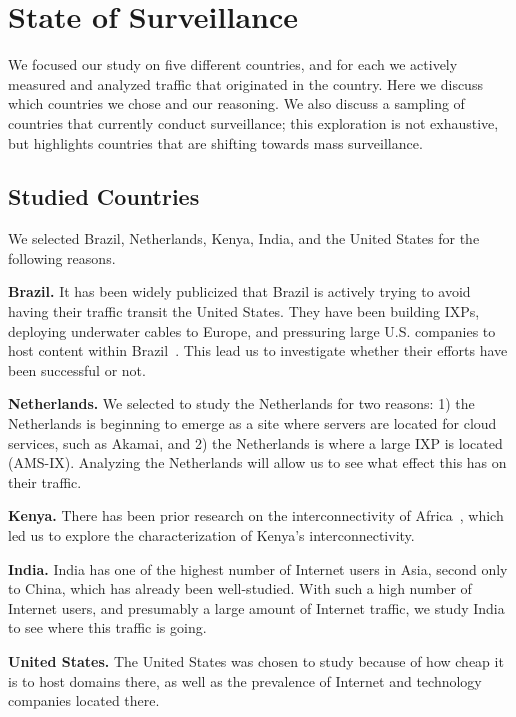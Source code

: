 \section{State of Surveillance}
\label{surv}
We focused our study on five different countries, and for each we actively measured and analyzed traffic that originated in the country.  Here we discuss which countries we chose and our reasoning.  We also discuss a sampling of countries that currently conduct surveillance; this exploration is not exhaustive, but highlights countries that are shifting towards mass surveillance.  

\subsection{Studied Countries}
We selected Brazil, Netherlands, Kenya, India, and the United States for the following reasons.

{\bf Brazil.} It has been widely publicized that Brazil is actively trying to avoid having their traffic transit the United States.  They have been building IXPs, deploying underwater cables to Europe, and pressuring large U.S. companies to host content within Brazil~\cite{brazil_history, brazil_break_from_US, brazil_conference,
  brazil_conference2, brazil_human_rights, brazil_cable, brazil_us_companies, brazil_IXP1}.  This lead us to investigate whether their efforts have been successful or not.

{\bf Netherlands.}  We selected to study the Netherlands for two reasons: 1) the Netherlands is beginning to emerge as a site where servers are located for cloud services, such as Akamai, and 2) the Netherlands is where a large IXP is located (AMS-IX). Analyzing the Netherlands will allow us to see what effect this has on their traffic.

{\bf Kenya.} There has been prior research on the interconnectivity of Africa~\cite{gupta2014peering, fanou2015diversity}, which led us to explore the characterization of Kenya's interconnectivity.

{\bf India.}  India has one of the highest number of Internet users in Asia, second only to China, which has already been well-studied.  With such a high number of Internet users, and presumably a large amount of Internet traffic, we study India to see where this traffic is going.

{\bf United States.}  The United States was chosen to study because of how cheap it is to host domains there, as well as the prevalence of Internet and technology companies located there.

